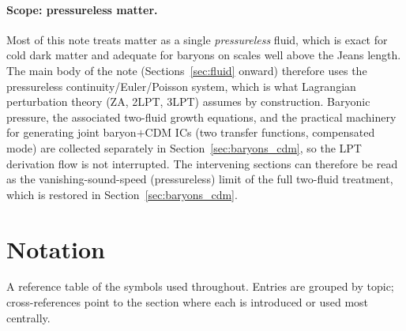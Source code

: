 \documentclass[12pt]{article}
\begin{document}
\paragraph{Scope: pressureless matter.}
Most of this note treats matter as a single \emph{pressureless} fluid,
which is exact for cold dark matter and adequate for baryons on scales
well above the Jeans length.  The main body of the note (Sections~\ref{sec:fluid} onward) therefore
uses the pressureless continuity/Euler/Poisson system, which is what
Lagrangian perturbation theory (ZA, 2LPT, 3LPT) assumes by
construction.  Baryonic pressure, the associated two-fluid growth
equations, and the practical machinery for generating joint
baryon$+$CDM ICs (two transfer functions, compensated mode) are
collected separately in Section~\ref{sec:baryons_cdm}, so the LPT
derivation flow is not interrupted.  The intervening sections can
therefore be read as the vanishing-sound-speed (pressureless) limit
of the full two-fluid treatment, which is restored in
Section~\ref{sec:baryons_cdm}.

\section{Notation}
\label{sec:notation}

A reference table of the symbols used throughout. Entries are grouped
by topic; cross-references point to the section where each is
introduced or used most centrally.
\end{document}
